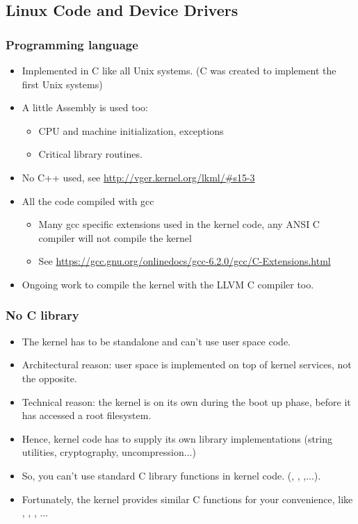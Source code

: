 \subsection{Linux Code and Device Drivers}

\begin{frame}
  \frametitle{Programming language}
  \begin{itemize}
  \item Implemented in C like all Unix systems. (C was created to
    implement the first Unix systems)
  \item A little Assembly is used too:
    \begin{itemize}
    \item CPU and machine initialization, exceptions
    \item Critical library routines.
    \end{itemize}
  \item No C++ used, see \url{http://vger.kernel.org/lkml/\#s15-3}
  \item All the code compiled with gcc
    \begin{itemize}
    \item Many gcc specific extensions used in the kernel code, any
      ANSI C compiler will not compile the kernel
    \item See
      \url{https://gcc.gnu.org/onlinedocs/gcc-6.2.0/gcc/C-Extensions.html}
    \end{itemize}
    \item Ongoing work to compile the kernel with the LLVM C compiler too.
  \end{itemize}
\end{frame}

\begin{frame}
  \frametitle{No C library}
  \begin{itemize}
  \item The kernel has to be standalone and can't use user space code.
  \item Architectural reason: user space is implemented on top of kernel services, not the
    opposite.
  \item Technical reason: the kernel is on its own during the boot up
    phase, before it has accessed a root filesystem.
  \item Hence, kernel code has to supply its own library implementations
    (string utilities, cryptography, uncompression...)
  \item So, you can't use standard C library functions in kernel code.
    (, , ,...).
  \item Fortunately, the kernel provides similar C functions for your
    convenience, like , ,
    , ...
  \end{itemize}
\end{frame}

